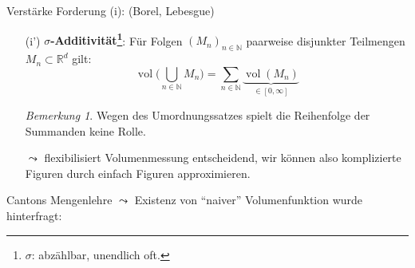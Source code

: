 \documentclass[12pt,a4paper]{article}
\theoremstyle{definition}
\theoremstyle{remark}
\newtheorem*{remark}{Bemerkung}
\newcommand{\R}{\mathbb{R}}
\newcommand{\N}{\mathbb{N}}
\newcommand{\vol}{\operatorname{vol}}
\begin{document}
Verstärke Forderung (i): (Borel, Lebesgue)
\begin{enumerate}
\item[(i')]\textbf{$\sigma$-Additivität\footnote{$\sigma$: abzählbar, unendlich oft.}}: Für Folgen $(M_n)_{n\in \N}$ paarweise disjunkter Teilmengen $M_n \subset \R^d$ gilt:
\begin{equation}
\vol\bigg( \bigcup_{n\in \N} M_n \bigg) = \sum_{n\in \N} \underbrace{\vol (M_n)}_{\in [0,\infty]} 
\end{equation}
\begin{remark}
Wegen des Umordnungssatzes spielt die Reihenfolge der Summanden keine Rolle.
\end{remark}
$\leadsto$ flexibilisiert Volumenmessung entscheidend, wir können also komplizierte Figuren durch einfach Figuren approximieren.
\end{enumerate}
Cantons Mengenlehre $\leadsto$ Existenz von ``naiver'' Volumenfunktion wurde hinterfragt: %
\end{document}
